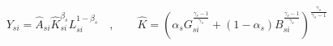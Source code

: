 \begin{equation}
    \label{eq:firm_output}
    Y_{si} = \hat{A}_{si}\hat{K}_{si}^{\beta_s} L_{si}^{1-\beta_s}
    \quad,\qquad\hat{K} = (
        \alpha_s G_{si}^{\frac{\gamma_s-1}{\gamma_s}} + (1-\alpha_s) B_{si}^{\frac{\gamma_s-1}{\gamma_s}}
    ) ^ {\frac{\gamma_s}{\gamma_s-1}}
\end{equation}